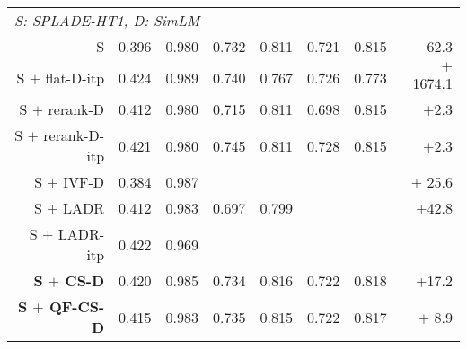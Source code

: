 {\begin{table*}[htbp]
\begin{small}
\begin{tabular}{ r r r |r r  |r r  |r}
            \multicolumn{7}{l}{\it  S: SPLADE-HT1, D: SimLM}&  \\
            S & 0.396 & 0.980 & 0.732   &  0.811 & 0.721    &  0.815  &   62.3 \\
          S $+$ flat-D-itp  & 0.424 & 0.989 & 0.740 & 0.767  & 0.726 & 0.773 & $+$ 1674.1 \\
            S $+$ rerank-D &  0.412 & 0.980    &0.715  & 0.811 & 0.698 & 0.815 & $+$2.3 \\
            S $+$ rerank-D-itp &  0.421 & 0.980 & 0.745 & 0.811 & 0.728 & 0.815 & $+$2.3 \\
           S $+$ IVF-D & 0.384 & 0.987 & & & & &  $+$ 25.6\\
           S  $+$ LADR & 0.412& 0.983& 0.697&0.799&& & $+$42.8 \\
 S $+$ LADR-itp& 0.422& 0.969& & & & &\\
            \bf S $+$ CS-D &  0.420 & 0.985 & 0.734 & 0.816 & 0.722 & 0.818 & +17.2 \\
             \bf S $+$ QF-CS-D &  0.415 & 0.983 & 0.735 & 0.815 & 0.722 & 0.817 & $+$ 8.9 \\

\end{tabular}
\end{small}
\end{table*}}
